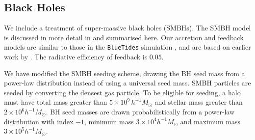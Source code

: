 \documentclass[fleqn,usenatbib]{mnras}
\def\bluetides{\texttt{BlueTides} }
\begin{document}
\subsection{Black Holes}
\label{sec:blackhole}

We include a treatment of super-massive black holes (SMBHs). The SMBH model is discussed in more detail in \cite{Ni:2021inprep} and summarised here. Our accretion and feedback models are similar to those in the \bluetides simulation \cite{Feng:2016}, and are based on earlier work by \cite{SDH2005,DSH2005}. The radiative efficiency of feedback is $0.05$. 

We have modified the SMBH seeding scheme, drawing the BH seed mass from a power-law distribution instead of using a universal seed mass. SMBH particles are seeded by converting the densest gas particle. To be eligible for seeding, a halo must have total mass greater than $5\times10^{9}\,h^{-1}\unit{M_\odot}$ and stellar mass greater than $2 \times 10^6 h^{-1} M_\odot$.
BH seed masses are drawn probabilistically from a power-law distribution with index $-1$, minimum mass $3 \times 10^4 h^{-1} M_\odot$ and maximum mass $3 \times 10^5 h^{-1} M_\odot$. 
\end{document}
